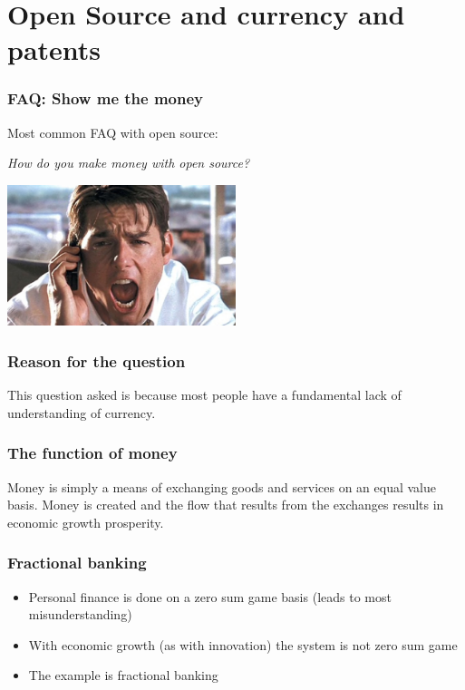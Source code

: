 \documentclass{beamer}
\begin{document}



\section{Open Source and currency and patents}


\begin{frame}
\frametitle{FAQ:  Show me the money}

Most common FAQ with open source:  

\begin{center}

\emph{How do you make money with open source?}

\includegraphics[width = 0.5\textwidth]{Pictures/showmethemoney.jpg}
\end{center}
\end{frame}


\begin{frame}
\frametitle{Reason for the question}

\begin{center}

This question asked is because most people have a fundamental lack of understanding of currency.

\end{center}
\end{frame}


\begin{frame}
\frametitle{The function of money}

Money is simply a means of exchanging goods and services on an equal value basis. Money is created and the flow that results from the exchanges results in economic growth prosperity.

\end{frame}

\begin{frame}
\frametitle{Fractional banking}

\begin{itemize}
\item Personal finance is done on a zero sum game basis (leads to most misunderstanding)
\item With economic growth (as with innovation) the system is not zero sum game
\item The example is fractional banking
\end{itemize}

\end{frame}
\end{document}
